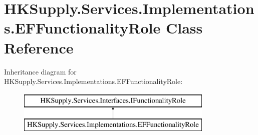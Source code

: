 \hypertarget{class_h_k_supply_1_1_services_1_1_implementations_1_1_e_f_functionality_role}{}\section{H\+K\+Supply.\+Services.\+Implementations.\+E\+F\+Functionality\+Role Class Reference}
\label{class_h_k_supply_1_1_services_1_1_implementations_1_1_e_f_functionality_role}
Inheritance diagram for H\+K\+Supply.\+Services.\+Implementations.\+E\+F\+Functionality\+Role\+:\begin{figure}[H]
\begin{center}
\leavevmode
\includegraphics[height=2.000000cm]{class_h_k_supply_1_1_services_1_1_implementations_1_1_e_f_functionality_role}
\end{center}
\end{figure}
